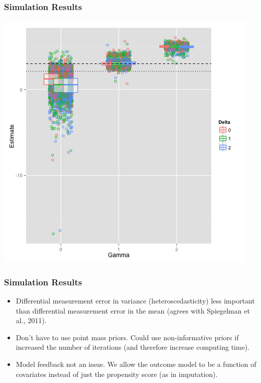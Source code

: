 \documentclass{beamer}
\begin{document}
\begin{frame}

\frametitle{ Simulation Results}

\centering
\includegraphics[width=\textwidth,height=0.9\textheight,keepaspectratio]{ATEsim}


 

\end{frame} 

\begin{frame}

\frametitle{ Simulation Results}

\begin{itemize}
\item Differential measurement error in variance (heteroscedasticity) less important than differential measurement error in the mean (agrees with Spiegelman et al., 2011).



\item Don't have to use point mass priors. Could use non-informative priors if increased the number of iterations (and therefore increase computing time).



\item Model feedback not an issue. We allow the outcome model to be a function of covariates instead of just the propensity score (as in imputation).

\end{itemize}
  

\end{frame} 
\end{document}
